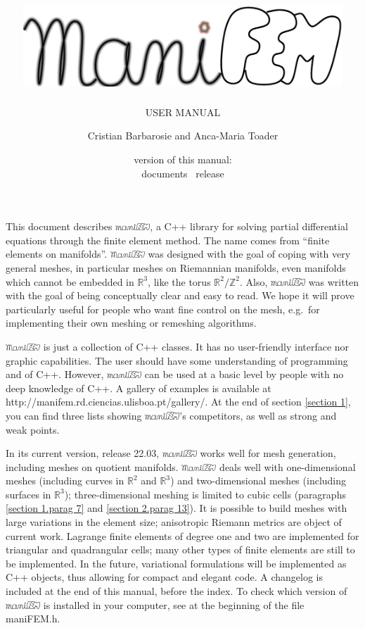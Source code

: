 \documentclass[a4paper]{scrreprt}
\title{\includegraphics[width=12cm]{manifem-grey-capital.eps}}
\subtitle{USER MANUAL}
\author{Cristian Barbarosie and Anca-Maria Toader}
\date{\small version of this manual: \manualversion\\ documents \maniFEM\ release \manifemrelease}
\def\manifemrelease{22.03}
\def\numb{}
\newcommand\ManiFEM{\leavevmode\hbox{\includegraphics[width=13mm]{manifem-large}}}
\newcommand\maniFEM{\leavevmode\hbox{\includegraphics[width=13mm]{manifem-small}}}
\renewcommand\tt{\normalfont\ttfamily}
\begin{document}
\begin{titlepage}
\maketitle
\end{titlepage}


\chapter*{}

This document describes \maniFEM, a {\tt C++} library for solving partial differential equations
through the finite element method.
The name comes from ``finite elements on manifolds''. 
{\ManiFEM} was designed with the goal of coping with very general meshes,
in particular meshes on Riemannian manifolds, even manifolds which cannot be embedded
in $ {\mathbb R}^3 $, like the torus $ {\mathbb R}^2/{\mathbb Z}^2 $.
Also, {\maniFEM} was written with the goal of being conceptually clear
and easy to read.
We hope it will prove particularly useful for people who want fine control on the mesh,
e.g.\ for implementing their own meshing or remeshing algorithms.

{\ManiFEM} is just a collection of {\tt C++} classes.
It has no user-friendly interface nor graphic capabilities.
The user should have some understanding of programming and of {\tt C++}.
However, {\maniFEM} can be used at a basic level by people with no deep knowledge of
{\tt C++}.
A gallery of examples is available at {\small\tt http://manifem.rd.ciencias.ulisboa.pt/gallery/}.
At the end of section \ref{\numb section 1}, you can find three lists showing
{\maniFEM}'s competitors, as well as strong and weak points.

In its current version, release \manifemrelease, {\maniFEM} works well for mesh generation,
including meshes on quotient manifolds.
{\ManiFEM} deals well with one-dimensional meshes (including curves in $ {\mathbb R}^2 $ and
$ {\mathbb R}^3 $) and two-dimensional meshes (including surfaces in $ {\mathbb R}^3 $);
three-dimensional meshing is limited to cubic cells
(paragraphs \ref{\numb section 1.\numb parag 7} and \ref{\numb section 2.\numb parag 13}).
It is possible to build meshes with large variations in the element size;
anisotropic Riemann metrics are object of current work.
Lagrange finite elements of degree one and two are implemented for triangular and quadrangular
cells; many other types of finite elements are still to be implemented.
In the future, variational formulations will be implemented as {\tt C++} objects,
thus allowing for compact and elegant code.
A changelog is included at the end of this manual, before the index.
To check which version of {\maniFEM} is installed in your computer,
see at the beginning of the file {\small\tt maniFEM.h}.
\end{document}
